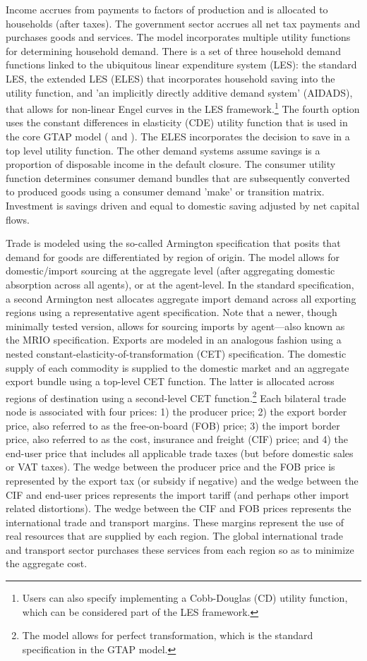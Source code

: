 \documentclass[11pt,letterpaper]{report}
\begin{document}
Income accrues from payments to factors of production and is allocated to
households (after taxes). The government sector accrues all net tax payments and
purchases goods and services. The model incorporates multiple utility functions
for determining household demand. There is a set of three household demand
functions linked to the ubiquitous linear expenditure system (LES): the standard
LES, the extended LES (ELES) that incorporates household saving into the utility
function, and 'an implicitly directly additive demand system' (AIDADS), that
allows for non-linear Engel curves in the LES framework.\footnote{Users can also
specify implementing a Cobb-Douglas (CD) utility function, which can be
considered part of the LES framework.}  The fourth option uses the constant
differences in elasticity (CDE) utility function that is used in the core
GTAP model (\cite{Hertel1997} and \cite{CorongetalJGEA2017}). The ELES
incorporates the decision to save in a top level utility function. The other
demand systems assume savings is a proportion of disposable income in
the default closure. The consumer utility function determines consumer demand
bundles that are subsequently converted to produced goods using a consumer
demand 'make' or transition matrix. Investment is savings driven and equal to
domestic saving adjusted by net capital flows.

Trade is modeled using the so-called Armington specification that posits that
demand for goods are differentiated by region of origin. The model allows for
domestic/import sourcing at the aggregate level (after aggregating domestic
absorption across all agents), or at the agent-level. In the standard
specification, a second Armington nest allocates aggregate import demand across
all exporting regions using a representative agent specification. Note that a
newer, though minimally tested version, allows for sourcing imports by
agent---also known as the MRIO specification. Exports are modeled in an
analogous fashion using a nested constant-elasticity-of-transformation (CET)
specification. The domestic supply of each commodity is supplied to the domestic
market and an aggregate export bundle using a top-level CET function. The latter
is allocated across regions of destination using a second-level CET
function.\footnote{The model allows for perfect transformation, which is the
standard specification in the GTAP model.} Each bilateral trade node is
associated with four prices: 1) the producer price; 2) the export border price,
also referred to as the free-on-board (FOB) price; 3) the import border price,
also referred to as the cost, insurance and freight (CIF) price; and 4) the
end-user price that includes all applicable trade taxes (but before domestic
sales or VAT taxes). The wedge between the
producer price and the FOB price is represented by the export tax (or subsidy if
negative) and the wedge between the CIF and end-user prices represents the
import tariff (and perhaps other import related distortions). The wedge between
the CIF and FOB prices represents the international trade and transport margins.
These margins represent the use of real resources that are supplied by each
region. The global international trade and transport sector purchases these
services from each region so as to minimize the aggregate cost.
\end{document}
